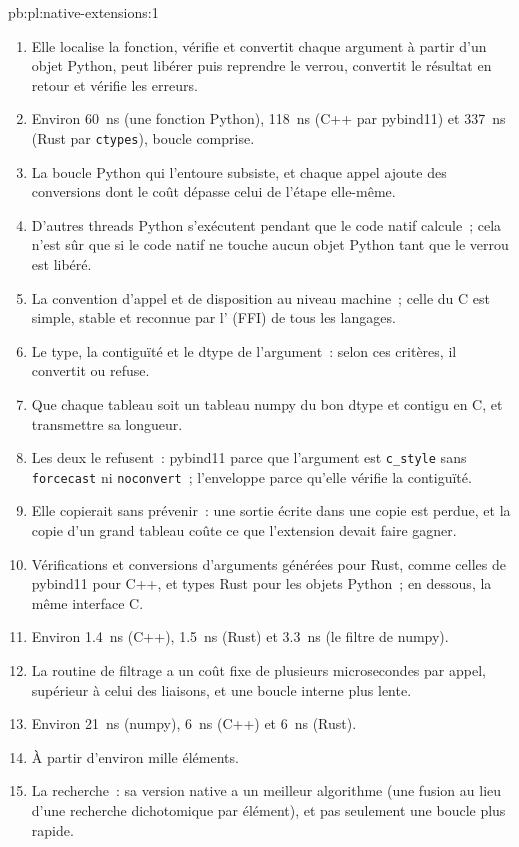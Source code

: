 \begin{solution}{pb:pl:native-extensions:1}
\begin{enumerate}
\item Elle localise la fonction, vérifie et convertit chaque argument à partir d'un objet Python, peut libérer puis reprendre le verrou, convertit le
résultat en retour et vérifie les erreurs.
\item Environ 60~ns (une fonction Python), 118~ns (C++ par pybind11) et 337~ns (Rust par \texttt{ctypes}), boucle comprise.
\item La boucle Python qui l'entoure subsiste, et chaque appel ajoute des conversions dont le coût dépasse celui de l'étape elle-même.
\item D'autres threads Python s'exécutent pendant que le code natif calcule~; cela n'est sûr que si le code natif ne touche aucun objet Python tant que le verrou
est libéré.
\item La convention d'appel et de disposition au niveau machine~; celle du C est simple, stable et reconnue par l' (FFI) de tous les langages.
\item Le type, la contiguïté et le dtype de l'argument~: selon ces critères, il convertit ou refuse.
\item Que chaque tableau soit un tableau numpy du bon dtype et contigu en C, et transmettre sa longueur.
\item Les deux le refusent~: pybind11 parce que l'argument est \texttt{c\_style} sans \texttt{forcecast} ni \texttt{noconvert}~; l'enveloppe
parce qu'elle vérifie la contiguïté.
\item Elle copierait sans prévenir~: une sortie écrite dans une copie est perdue, et la copie d'un grand tableau coûte ce que l'extension devait
faire gagner.
\item Vérifications et conversions d'arguments générées pour Rust, comme celles de pybind11 pour C++, et types Rust pour les objets Python~; en dessous, la même
interface C.
\item Environ 1.4~ns (C++), 1.5~ns (Rust) et 3.3~ns (le filtre de numpy).
\item La routine de filtrage a un coût fixe de plusieurs microsecondes par appel, supérieur à celui des liaisons, et une boucle interne plus lente.
\item Environ 21~ns (numpy), 6~ns (C++) et 6~ns (Rust).
\item À partir d'environ mille éléments.
\item La recherche~: sa version native a un meilleur algorithme (une fusion au lieu d'une recherche dichotomique par élément), et pas seulement une boucle plus rapide.

\end{enumerate}
\end{solution}
